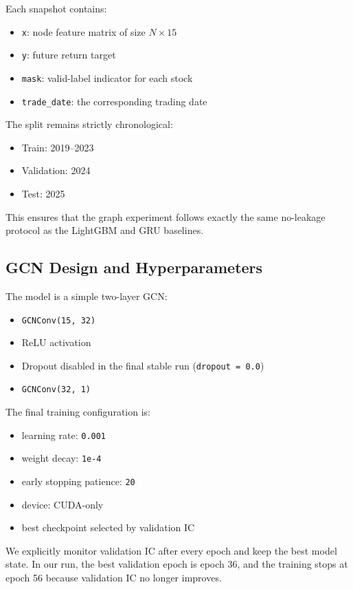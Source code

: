 Each snapshot contains:
\begin{itemize}
\item \texttt{x}: node feature matrix of size $N \times 15$
\item \texttt{y}: future return target
\item \texttt{mask}: valid-label indicator for each stock
\item \texttt{trade\_date}: the corresponding trading date
\end{itemize}

The split remains strictly chronological:
\begin{itemize}
\item Train: 2019--2023
\item Validation: 2024
\item Test: 2025
\end{itemize}

This ensures that the graph experiment follows exactly the same no-leakage protocol as the LightGBM and GRU baselines.

\subsection{GCN Design and Hyperparameters}

The model is a simple two-layer GCN:
\begin{itemize}
\item \texttt{GCNConv(15, 32)}
\item ReLU activation
\item Dropout disabled in the final stable run (\texttt{dropout = 0.0})
\item \texttt{GCNConv(32, 1)}
\end{itemize}

The final training configuration is:
\begin{itemize}
\item learning rate: \texttt{0.001}
\item weight decay: \texttt{1e-4}
\item early stopping patience: \texttt{20}
\item device: CUDA-only
\item best checkpoint selected by validation IC
\end{itemize}

We explicitly monitor validation IC after every epoch and keep the best model state. In our run, the best validation epoch is epoch 36, and the training stops at epoch 56 because validation IC no longer improves.

